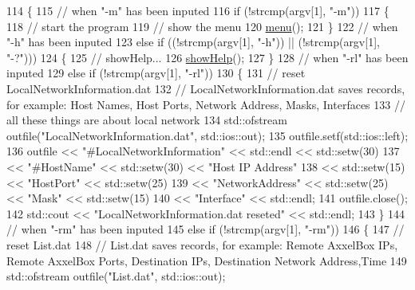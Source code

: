 \begin{DoxyCode}
114 \{
115     \textcolor{comment}{// when "-m" has been inputed}
116     \textcolor{keywordflow}{if} (!strcmp(argv[1], \textcolor{stringliteral}{"-m"}))
117     \{
118         \textcolor{comment}{// start the program}
119         \textcolor{comment}{// show the menu}
120         \hyperlink{classControlCenter_a35b34a9192e2d04936d6743107dd1280}{menu}();
121     \}
122     \textcolor{comment}{// when "-h" has been inputed}
123     \textcolor{keywordflow}{else} \textcolor{keywordflow}{if} ((!strcmp(argv[1], \textcolor{stringliteral}{"-h"})) || (!strcmp(argv[1], \textcolor{stringliteral}{"-?"})))
124     \{
125         \textcolor{comment}{// showHelp...}
126         \hyperlink{classControlCenter_a6c95b81bd573104c303821bb18777e62}{showHelp}();
127     \}
128     \textcolor{comment}{// when "-rl" has been inputed}
129     \textcolor{keywordflow}{else} \textcolor{keywordflow}{if} (!strcmp(argv[1], \textcolor{stringliteral}{"-rl"}))
130     \{
131         \textcolor{comment}{// reset LocalNetworkInformation.dat}
132         \textcolor{comment}{// LocalNetworkInformation.dat saves records, for example: Host Names, Host Ports, Network Address,
       Masks, Interfaces}
133         \textcolor{comment}{// all these things are about local network}
134         std::ofstream outfile(\textcolor{stringliteral}{"LocalNetworkInformation.dat"}, std::ios::out);
135         outfile.setf(std::ios::left);
136         outfile << \textcolor{stringliteral}{"#LocalNetworkInformation"} << std::endl << std::setw(30)
137                 << \textcolor{stringliteral}{"#HostName"} << std::setw(30) << \textcolor{stringliteral}{"Host IP Address"}
138                 << std::setw(15) << \textcolor{stringliteral}{"HostPort"} << std::setw(25)
139                 << \textcolor{stringliteral}{"NetworkAddress"} << std::setw(25) << \textcolor{stringliteral}{"Mask"} << std::setw(15)
140                 << \textcolor{stringliteral}{"Interface"} << std::endl;
141         outfile.close();
142         std::cout << \textcolor{stringliteral}{"LocalNetworkInformation.dat reseted"} << std::endl;
143     \}
144     \textcolor{comment}{// when "-rm" has been inputed}
145     \textcolor{keywordflow}{else} \textcolor{keywordflow}{if} (!strcmp(argv[1], \textcolor{stringliteral}{"-rm"}))
146     \{
147         \textcolor{comment}{// reset List.dat}
148         \textcolor{comment}{// List.dat saves records, for example: Remote AxxelBox IPs, Remote AxxelBox Ports, Destination
       IPs, Destination Network Address,Time}
149         std::ofstream outfile(\textcolor{stringliteral}{"List.dat"}, std::ios::out);

\end{DoxyCode}
